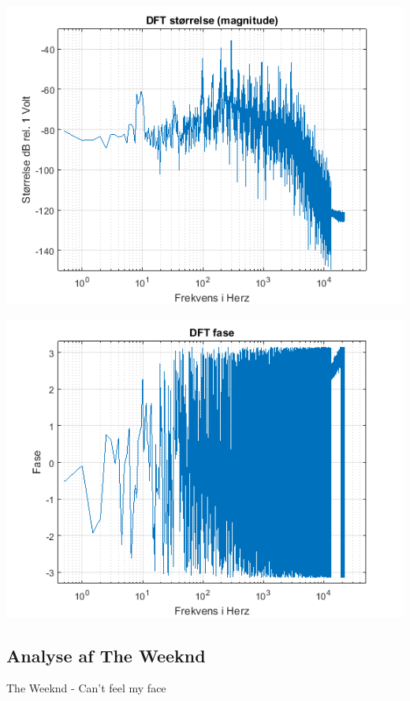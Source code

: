 \documentclass[12pt, letterpaper]{article}
\begin{document}
\begin{center}
\includegraphics[width=\textwidth]{billeder/mozartstorrelse}
\end{center}

\begin{center}
\includegraphics[width=\textwidth]{billeder/mozartfase}
\end{center}

\subsection{Analyse af The Weeknd}
The Weeknd - Can't feel my face
\end{document}

